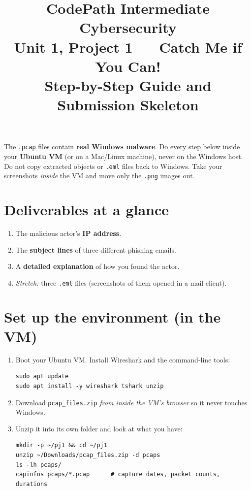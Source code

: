 \documentclass[11pt]{article}
\title{CodePath Intermediate Cybersecurity \\ Unit 1, Project 1 --- Catch Me if You Can! \\ \large Step-by-Step Guide and Submission Skeleton}
\author{}
\date{}
\begin{document}
\maketitle

\begin{warnbox}
The \texttt{.pcap} files contain \textbf{real Windows malware}. Do every step below inside your
\textbf{Ubuntu VM} (or on a Mac/Linux machine), never on the Windows host. Do not copy extracted
objects or \texttt{.eml} files back to Windows. Take your screenshots \emph{inside} the VM and move
only the \texttt{.png} images out.
\end{warnbox}

\section*{Deliverables at a glance}
\begin{enumerate}[label=\arabic*.]
  \item The malicious actor's \textbf{IP address}.
  \item The \textbf{subject lines} of three different phishing emails.
  \item A \textbf{detailed explanation} of how you found the actor.
  \item \emph{Stretch:} three \texttt{.eml} files (screenshots of them opened in a mail client).
\end{enumerate}

\section{Set up the environment (in the VM)}
\begin{enumerate}[label=\textbf{1.\arabic*}]
  \item Boot your Ubuntu VM. Install Wireshark and the command-line tools:
\begin{lstlisting}
sudo apt update
sudo apt install -y wireshark tshark unzip
\end{lstlisting}
  \item Download \texttt{pcap\_files.zip} \emph{from inside the VM's browser} so it never touches Windows.
  \item Unzip it into its own folder and look at what you have:
\begin{lstlisting}
mkdir -p ~/pj1 && cd ~/pj1
unzip ~/Downloads/pcap_files.zip -d pcaps
ls -lh pcaps/
capinfos pcaps/*.pcap      # capture dates, packet counts, durations
\end{lstlisting}
\end{enumerate}
\end{document}
